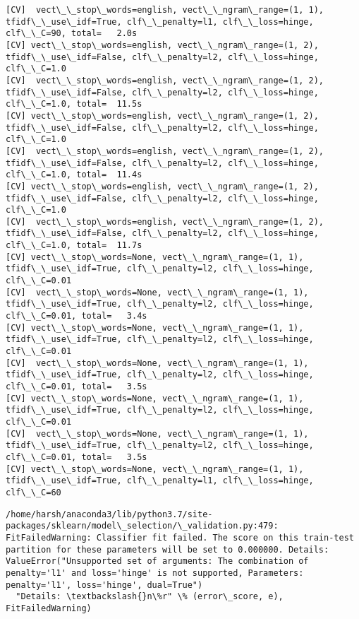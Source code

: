 \documentclass[11pt]{article}
\begin{document}
    \begin{Verbatim}[commandchars=\\\{\}]
[CV]  vect\_\_stop\_words=english, vect\_\_ngram\_range=(1, 1), tfidf\_\_use\_idf=True, clf\_\_penalty=l1, clf\_\_loss=hinge, clf\_\_C=90, total=   2.0s
[CV] vect\_\_stop\_words=english, vect\_\_ngram\_range=(1, 2), tfidf\_\_use\_idf=False, clf\_\_penalty=l2, clf\_\_loss=hinge, clf\_\_C=1.0 
[CV]  vect\_\_stop\_words=english, vect\_\_ngram\_range=(1, 2), tfidf\_\_use\_idf=False, clf\_\_penalty=l2, clf\_\_loss=hinge, clf\_\_C=1.0, total=  11.5s
[CV] vect\_\_stop\_words=english, vect\_\_ngram\_range=(1, 2), tfidf\_\_use\_idf=False, clf\_\_penalty=l2, clf\_\_loss=hinge, clf\_\_C=1.0 
[CV]  vect\_\_stop\_words=english, vect\_\_ngram\_range=(1, 2), tfidf\_\_use\_idf=False, clf\_\_penalty=l2, clf\_\_loss=hinge, clf\_\_C=1.0, total=  11.4s
[CV] vect\_\_stop\_words=english, vect\_\_ngram\_range=(1, 2), tfidf\_\_use\_idf=False, clf\_\_penalty=l2, clf\_\_loss=hinge, clf\_\_C=1.0 
[CV]  vect\_\_stop\_words=english, vect\_\_ngram\_range=(1, 2), tfidf\_\_use\_idf=False, clf\_\_penalty=l2, clf\_\_loss=hinge, clf\_\_C=1.0, total=  11.7s
[CV] vect\_\_stop\_words=None, vect\_\_ngram\_range=(1, 1), tfidf\_\_use\_idf=True, clf\_\_penalty=l2, clf\_\_loss=hinge, clf\_\_C=0.01 
[CV]  vect\_\_stop\_words=None, vect\_\_ngram\_range=(1, 1), tfidf\_\_use\_idf=True, clf\_\_penalty=l2, clf\_\_loss=hinge, clf\_\_C=0.01, total=   3.4s
[CV] vect\_\_stop\_words=None, vect\_\_ngram\_range=(1, 1), tfidf\_\_use\_idf=True, clf\_\_penalty=l2, clf\_\_loss=hinge, clf\_\_C=0.01 
[CV]  vect\_\_stop\_words=None, vect\_\_ngram\_range=(1, 1), tfidf\_\_use\_idf=True, clf\_\_penalty=l2, clf\_\_loss=hinge, clf\_\_C=0.01, total=   3.5s
[CV] vect\_\_stop\_words=None, vect\_\_ngram\_range=(1, 1), tfidf\_\_use\_idf=True, clf\_\_penalty=l2, clf\_\_loss=hinge, clf\_\_C=0.01 
[CV]  vect\_\_stop\_words=None, vect\_\_ngram\_range=(1, 1), tfidf\_\_use\_idf=True, clf\_\_penalty=l2, clf\_\_loss=hinge, clf\_\_C=0.01, total=   3.5s
[CV] vect\_\_stop\_words=None, vect\_\_ngram\_range=(1, 1), tfidf\_\_use\_idf=True, clf\_\_penalty=l1, clf\_\_loss=hinge, clf\_\_C=60 

    \end{Verbatim}

    \begin{Verbatim}[commandchars=\\\{\}]
/home/harsh/anaconda3/lib/python3.7/site-packages/sklearn/model\_selection/\_validation.py:479: FitFailedWarning: Classifier fit failed. The score on this train-test partition for these parameters will be set to 0.000000. Details: 
ValueError("Unsupported set of arguments: The combination of penalty='l1' and loss='hinge' is not supported, Parameters: penalty='l1', loss='hinge', dual=True")
  "Details: \textbackslash{}n\%r" \% (error\_score, e), FitFailedWarning)

    \end{Verbatim}
\end{document}

